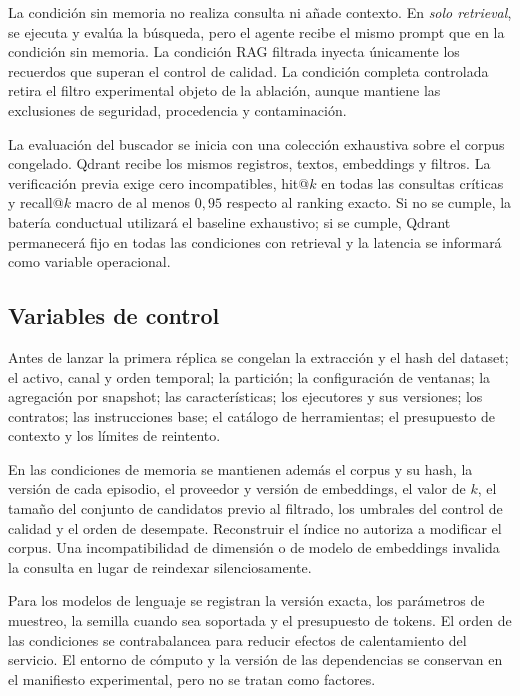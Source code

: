La condición sin memoria no realiza consulta ni añade contexto. En
\emph{solo retrieval}, se ejecuta y evalúa la búsqueda, pero el agente recibe
el mismo prompt que en la condición sin memoria. La condición RAG filtrada
inyecta únicamente los recuerdos que superan el control de calidad. La
condición completa controlada retira el filtro experimental objeto de la
ablación, aunque mantiene las exclusiones de seguridad, procedencia y
contaminación.

La evaluación del buscador se inicia con una colección exhaustiva sobre el
corpus congelado. Qdrant recibe los mismos registros, textos, embeddings y
filtros. La verificación previa exige cero incompatibles, hit@$k$ en todas las
consultas críticas y recall@$k$ macro de al menos $0{,}95$ respecto al ranking exacto.
Si no se cumple, la batería conductual utilizará el baseline exhaustivo; si se
cumple, Qdrant permanecerá fijo en todas las condiciones con retrieval y la
latencia se informará como variable operacional.

\subsection{Variables de control}

Antes de lanzar la primera réplica se congelan la extracción y el hash del
dataset; el activo, canal y orden temporal; la partición; la configuración de
ventanas; la agregación por snapshot; las características; los ejecutores y sus
versiones; los contratos; las instrucciones base; el catálogo de herramientas;
el presupuesto de contexto y los límites de reintento.

En las condiciones de memoria se mantienen además el corpus y su hash, la
versión de cada episodio, el proveedor y versión de embeddings, el valor de
$k$, el tamaño del conjunto de candidatos previo al filtrado, los umbrales del
control de calidad y el orden de desempate. Reconstruir el índice no autoriza a modificar el
corpus. Una incompatibilidad de dimensión o de modelo de embeddings invalida
la consulta en lugar de reindexar silenciosamente.

Para los modelos de lenguaje se registran la versión exacta, los parámetros de
muestreo, la semilla cuando sea soportada y el presupuesto de tokens. El orden
de las condiciones se contrabalancea para reducir efectos de calentamiento del
servicio. El entorno de cómputo y la versión de las dependencias se conservan en
el manifiesto experimental, pero no se tratan como factores.

